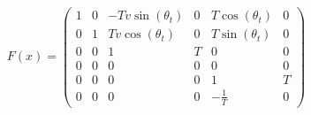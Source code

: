\[
    F(x) = \begin{pmatrix}
        1 & 0 & - T v \sin{\left (\theta_t \right )} & 0 & T \cos{\left (\theta_t \right )} & 0\\
        0 & 1 & T v \cos{\left (\theta_t \right )} & 0 & T \sin{\left (\theta_t \right )} & 0\\
        0 & 0 & 1 & T & 0 & 0\\
        0 & 0 & 0 & 0 & 0 & 0\\
        0 & 0 & 0 & 0 & 1 & T\\
        0 & 0 & 0 & 0 & - \frac{1}{T} & 0\end{pmatrix}
\]
